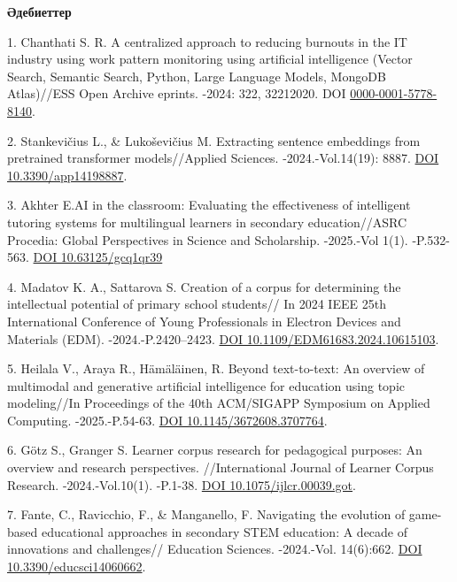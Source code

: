 \begin{center}
{\bfseries Әдебиеттер}
\end{center}

\begin{refs}
1. Chanthati S. R. A centralized approach to reducing burnouts in the IT
industry using work pattern monitoring using artificial intelligence
(Vector Search, Semantic Search, Python, Large Language Models, MongoDB
Atlas)//ESS Open Archive eprints. -2024: 322, 32212020. DOI
\href{https://orcid.org/0000-0001-5778-8140}{0000-0001-5778-8140}.

2. Stankevičius L., \& Lukoševičius M. Extracting sentence embeddings
from pretrained transformer models//Applied Sciences. -2024.-Vol.14(19):
8887. \href{https://doi.org/10.3390/app14198887}{DOI
10.3390/app14198887}.

3. Akhter E.AI in the classroom: Evaluating the effectiveness of
intelligent tutoring systems for multilingual learners in secondary
education//ASRC Procedia: Global Perspectives in Science and
Scholarship. -2025.-Vol 1(1). -P.532-563.
\href{https://doi.org/10.63125/gcq1qr39}{DOI 10.63125/gcq1qr39}

4. Madatov K. A., Sattarova S. Creation of a corpus for determining the
intellectual potential of primary school students// In 2024 IEEE 25th
International Conference of Young Professionals in Electron Devices and
Materials (EDM). -2024.-P.2420--2423.
\href{https://doi.org/10.1109/EDM61683.2024.10615103}{DOI
10.1109/EDM61683.2024.10615103}.

5. Heilala V., Araya R., Hämäläinen, R. Beyond text-to-text: An overview
of multimodal and generative artificial intelligence for education using
topic modeling//In Proceedings of the 40th ACM/SIGAPP Symposium on
Applied Computing. -2025.-P.54-63.
\href{https://doi.org/10.1145/3672608.3707764}{DOI
10.1145/3672608.3707764}.

6. Götz S., Granger S. Learner corpus research for pedagogical purposes:
An overview and research perspectives. //International Journal of
Learner Corpus Research. -2024.-Vol.10(1). -P.1-38.
\href{https://doi.org/10.1075/ijlcr.00039.got}{DOI
10.1075/ijlcr.00039.got}.

7. Fante, C., Ravicchio, F., \& Manganello, F. Navigating the evolution
of game-based educational approaches in secondary STEM education: A
decade of innovations and challenges// Education Sciences. -2024.-Vol.
14(6):662. \href{https://doi.org/10.3390/educsci14060662}{DOI
10.3390/educsci14060662}.


\end{refs}
